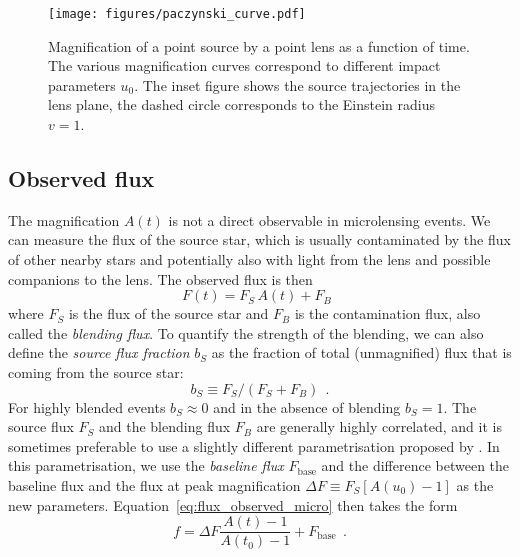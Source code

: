 \documentclass[12pt,dvipsnames]{report}
\newcommand{\hquad}{~~}
\begin{document}
\begin{figure}[t]
    \begin{centering}
        \texttt{[image: figures/paczynski\_curve.pdf]}
        \caption{
            Magnification of a point source by a point lens as a function of time. The
            various magnification curves correspond to different impact parameters $u_0$.
            The inset figure
            shows the source trajectories in the lens plane, the dashed circle corresponds
            to the Einstein radius $v=1$.}
        \label{fig:paczynski_curve}
    \end{centering}
\end{figure}

\subsection{Observed flux}
The magnification $A(t)$ is not a direct observable in microlensing events. We
can measure the flux of the source star, which is usually contaminated by 
the flux of other nearby stars and potentially also
with light from the lens and possible companions to the lens. The observed flux
is then
\begin{equation}
    F(t)=F_S\,A(t)+F_B
    \hquad
    \label{eq:flux_observed_micro}
\end{equation}
where $F_S$ is the flux of the source star and $F_B$ is the contamination flux, also
called the \emph{blending flux}. To quantify the strength of the blending, we can also
define the \emph{source flux fraction} $b_S$ as the fraction of total (unmagnified)
flux that is coming from the source star:
\begin{equation}
    b_S\equiv F_S/(F_S + F_B)
    \hquad.
\end{equation}
For highly blended events $b_S\approx 0$ and in the absence of blending $b_S=1$.
The source flux $F_S$ and the blending flux $F_B$ are generally highly correlated,
and it is sometimes preferable to use a slightly different parametrisation proposed by
\citet{2009MNRAS.393..816D}. In this parametrisation, we use the
\emph{baseline flux} $F_\mathrm{base}$ and the difference between
the baseline flux and the flux at peak magnification $\Delta F\equiv F_S[A(u_0)-1]$
as the new parameters.
Equation~\ref{eq:flux_observed_micro} then takes the form
\begin{equation}
    f=\Delta F\frac{A(t) - 1}{A(t_0)-1}+F_\mathrm{base}
    \hquad.
    \label{eq:flux_dominik}
\end{equation}
\end{document}
